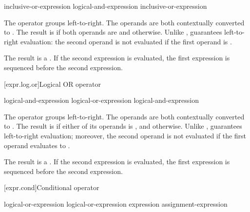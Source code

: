 \begin{bnf}
\br
    inclusive-or-expression\br
    logical-and-expression \terminal{\&\&} inclusive-or-expression
\end{bnf}

\pnum
The \tcode{\&\&} operator groups left-to-right. The operands are both
contextually converted to .
The
result is  if both operands are  and
 otherwise. Unlike \tcode{\&}, \tcode{\&\&} guarantees
left-to-right evaluation: the second operand is not evaluated if the
first operand is .

\pnum
The result is a .
%
If the second expression is evaluated,
the first expression is sequenced before
the second expression.

[expr.log.or]{Logical OR operator}%
%
%
%

\begin{bnf}
\br
    logical-and-expression\br
    logical-or-expression \terminal{||} logical-and-expression
\end{bnf}

\pnum
The \tcode{||} operator groups left-to-right. The operands are both
contextually converted to .
The result is
 if either of its operands is , and
 otherwise. Unlike \tcode{|}, \tcode{||} guarantees
left-to-right evaluation; moreover, the second operand is not evaluated
if the first operand evaluates to .

\pnum
The result is a .
%
If the second expression is evaluated,
the first expression is sequenced before
the second expression.

[expr.cond]{Conditional operator}%
%
%
%

\begin{bnf}
\br
    logical-or-expression\br
    logical-or-expression  expression \terminal{:} assignment-expression
\end{bnf}

